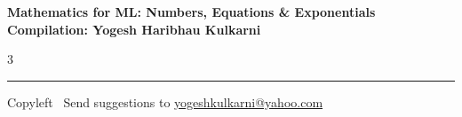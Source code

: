 \documentclass[8pt,landscape]{article}
\begin{document}
\footnotesize


\begin{center}
\Large{\textbf{Mathematics for ML: Numbers, Equations \& Exponentials\\ Compilation: Yogesh Haribhau Kulkarni}}
\end{center}

\begin{multicols}{3}

\end{multicols}

\rule{\linewidth}{0.25pt}
\scriptsize
Copyleft \textcopyleft\  Send suggestions to
\href{http://www.yogeshkulkarni.com}{yogeshkulkarni@yahoo.com}
\end{document}
